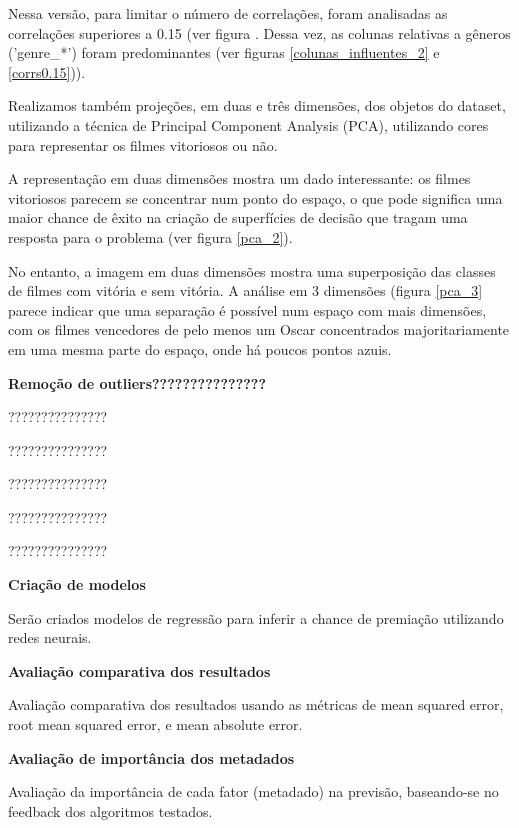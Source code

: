             Nessa versão, para limitar o número de correlações, foram analisadas as correlações superiores a 0.15 (ver figura . Dessa vez, as colunas relativas a gêneros ('genre\_*') foram predominantes (ver figuras \ref{colunas_influentes_2} e \ref{corrs0.15})).

            Realizamos também projeções, em duas e três dimensões, dos objetos do dataset, utilizando a técnica de Principal Component Analysis (PCA), utilizando cores para representar os filmes vitoriosos ou não.
            
            A representação em duas dimensões mostra um dado interessante: os filmes vitoriosos parecem se concentrar num ponto do espaço, o que pode significa uma maior chance de êxito na criação de superfícies de decisão que tragam uma resposta para o problema (ver figura \ref{pca_2}).
            
            No entanto, a imagem em duas dimensões mostra uma superposição das classes de filmes com vitória e sem vitória. A análise em 3 dimensões (figura \ref{pca_3} parece indicar que uma separação é possível num espaço com mais dimensões, com os filmes vencedores de pelo menos um Oscar concentrados majoritariamente em uma mesma parte do espaço, onde há poucos pontos azuis.\newline
            
            \textbf{Remoção de outliers???????????????}\par
            ???????????????\par
            ???????????????\par
            ???????????????\par
            ???????????????\par
            ???????????????\newline

            \textbf{Criação de modelos}\par
            Serão criados modelos de regressão para inferir a chance de premiação utilizando redes neurais.\newline

            \textbf{Avaliação comparativa dos resultados}\par
            Avaliação comparativa dos resultados usando as métricas de mean squared error, root mean squared error, e mean absolute error.\newline

            \textbf{Avaliação de importância dos metadados}\par
            Avaliação da importância de cada fator (metadado) na previsão, baseando-se no feedback dos algoritmos testados.\newline

